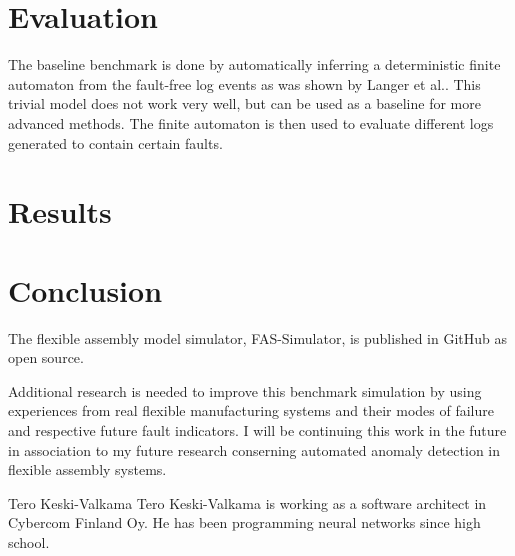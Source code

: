 \documentclass[journal]{IEEEtran}
\begin{document}
\section{Evaluation}

The baseline benchmark is done by automatically inferring a deterministic finite automaton from the fault-free log events as was shown by Langer et al.\cite{langer2011self}.
This trivial model does not work very well, but can be used as a baseline for more advanced methods. The finite automaton is then used to evaluate different logs generated to
contain certain faults.

\section{Results}

\section{Conclusion}

The flexible assembly model simulator, FAS-Simulator, is published in GitHub\cite{FASSimulator} as open source.

Additional research is needed to improve this benchmark simulation by using experiences from real flexible manufacturing systems and their modes of failure
and respective future fault indicators. I will be continuing this work in the future in association to my future research conserning automated anomaly detection
in flexible assembly systems.

\appendices




\begin{IEEEbiography}{Tero Keski-Valkama}
Tero Keski-Valkama is working as a software architect in Cybercom Finland Oy. He has been programming neural networks since high school.
\end{IEEEbiography}
\end{document}
